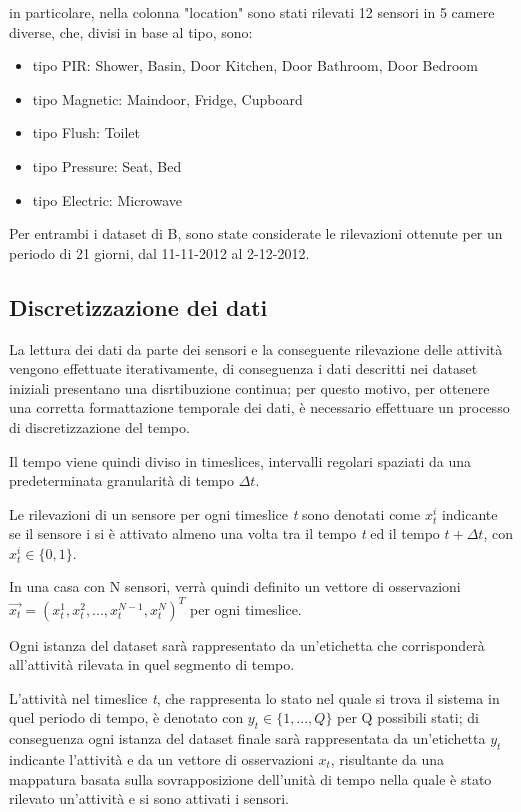 \documentclass[10pt,a4paper]{article}
\begin{document}
	in particolare, nella colonna "location" sono stati rilevati 12 sensori in 5 camere diverse, che, divisi in base al tipo, sono:
	
	\begin{itemize}
		\item tipo PIR: Shower, Basin, Door Kitchen, Door Bathroom, Door Bedroom
		\item tipo Magnetic: Maindoor, Fridge, Cupboard
		\item  tipo Flush: Toilet
		\item tipo Pressure: Seat, Bed
		\item tipo Electric: Microwave
	\end{itemize}
	
	Per entrambi i dataset di B, sono state considerate le rilevazioni ottenute per un periodo di 21 giorni, dal 11-11-2012 al 2-12-2012.
	
	\subsection{Discretizzazione dei dati}
	La lettura dei dati da parte dei sensori e la conseguente rilevazione delle attività vengono effettuate iterativamente, di conseguenza i dati descritti nei dataset iniziali presentano una disrtibuzione continua; per questo motivo, per ottenere una corretta formattazione temporale dei dati, è necessario effettuare un processo di discretizzazione del tempo.
	
	Il tempo viene quindi diviso in timeslices, intervalli regolari spaziati da una predeterminata granularità di tempo $ \Delta t $.
	
	Le rilevazioni di un sensore per ogni timeslice \textit{t} sono denotati come $ x^{i}_{t} $ indicante se il sensore i si è attivato almeno una volta tra il tempo \textit{t} ed il tempo $ t + \Delta t $, con $ x^{i}_{t}  \in  \{0, 1\} $. 
	
	In una casa con N sensori, verrà quindi definito un vettore di osservazioni $ \vec{x_{t}}  = (x^{1}_{t} , x^{2}_{t} , . . . , x^{N-1}_{t} , x^{N}_{t} )^{T} $   per ogni timeslice.
	
	Ogni istanza del dataset sarà rappresentato da un'etichetta che corrisponderà all'attività rilevata in quel segmento di tempo.
	
	L'attività nel timeslice \textit{t}, che rappresenta lo stato nel quale si trova il sistema in quel periodo di tempo, è denotato con $ y_{t}  \in  \{1, . . . , Q\} $ per Q possibili stati; di conseguenza ogni istanza del dataset finale sarà rappresentata da un'etichetta $ y_{t} $ indicante l'attività e da un vettore di osservazioni $ x_{t} $, risultante da una mappatura basata sulla sovrapposizione dell'unità di tempo nella quale è stato rilevato un'attività e si sono attivati i sensori.
	
\end{document}
